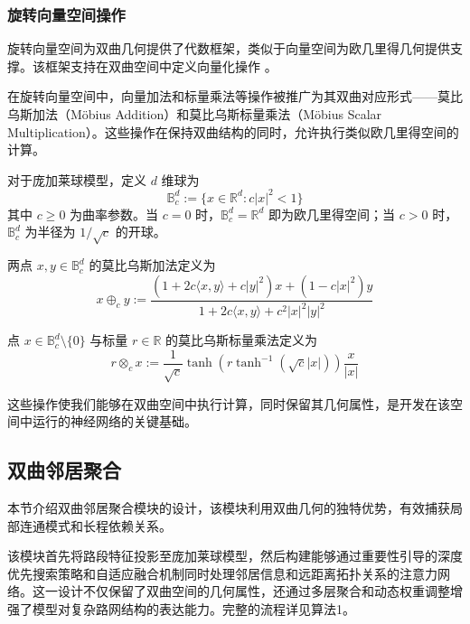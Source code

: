 \subsubsection{旋转向量空间操作}

旋转向量空间为双曲几何提供了代数框架，类似于向量空间为欧几里得几何提供支撑。该框架支持在双曲空间中定义向量化操作 \cite{Ungar2008}。

在旋转向量空间中，向量加法和标量乘法等操作被推广为其双曲对应形式——莫比乌斯加法（M\"obius Addition）和莫比乌斯标量乘法（M\"obius Scalar Multiplication）。这些操作在保持双曲结构的同时，允许执行类似欧几里得空间的计算。

对于庞加莱球模型，定义 $d$ 维球为
\begin{equation}
\mathbb{B}_c^d := \{x \in \mathbb{R}^d : c|x|^2 < 1\}
\label{eq:poincare_ball}
\end{equation}
其中 $c \geq 0$ 为曲率参数。当 $c = 0$ 时，$\mathbb{B}_c^d = \mathbb{R}^d$ 即为欧几里得空间；当 $c > 0$ 时，$\mathbb{B}_c^d$ 为半径为 $1/\sqrt{c}$ 的开球。

两点 $x, y \in \mathbb{B}_c^d$ 的莫比乌斯加法定义为
\begin{equation}
x \oplus_c y := \frac{(1 + 2c\langle x,y\rangle + c|y|^2)x + (1 - c|x|^2)y}{1 + 2c\langle x,y\rangle + c^2|x|^2|y|^2}
\label{eq:mobius_addition}
\end{equation}

点 $x \in \mathbb{B}_c^d \setminus \{0\}$ 与标量 $r \in \mathbb{R}$ 的莫比乌斯标量乘法定义为
\begin{equation}
r \otimes_c x := \frac{1}{\sqrt{c}}\tanh\left(r\tanh^{-1}(\sqrt{c}|x|)\right)\frac{x}{|x|}
\label{eq:mobius_scalar}
\end{equation}

这些操作使我们能够在双曲空间中执行计算，同时保留其几何属性，是开发在该空间中运行的神经网络的关键基础。

\subsection{双曲邻居聚合}

本节介绍双曲邻居聚合模块的设计，该模块利用双曲几何的独特优势，有效捕获局部连通模式和长程依赖关系。

该模块首先将路段特征投影至庞加莱球模型，然后构建能够通过重要性引导的深度优先搜索策略和自适应融合机制同时处理邻居信息和远距离拓扑关系的注意力网络。这一设计不仅保留了双曲空间的几何属性，还通过多层聚合和动态权重调整增强了模型对复杂路网结构的表达能力。完整的流程详见算法1。

